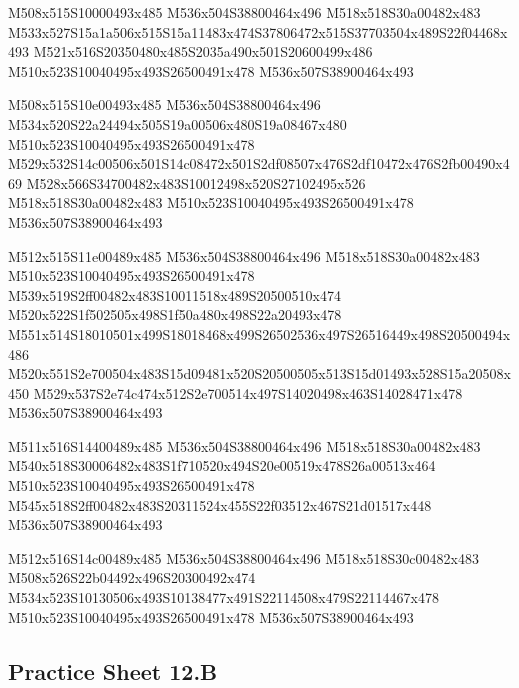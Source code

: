\documentclass{article}
\begin{document}
\begin{multicols}{5}
\begin{center}

M508x515S10000493x485 %
M536x504S38800464x496 %
M518x518S30a00482x483 %
M533x527S15a1a506x515S15a11483x474S37806472x515S37703504x489S22f04468x493 %
M521x516S20350480x485S2035a490x501S20600499x486 %
M510x523S10040495x493S26500491x478 %
M536x507S38900464x493 %
\vfil
\columnbreak

M508x515S10e00493x485 %
M536x504S38800464x496 %
M534x520S22a24494x505S19a00506x480S19a08467x480 %
M510x523S10040495x493S26500491x478 %
M529x532S14c00506x501S14c08472x501S2df08507x476S2df10472x476S2fb00490x469 %
M528x566S34700482x483S10012498x520S27102495x526 %
M518x518S30a00482x483 %
M510x523S10040495x493S26500491x478 %
M536x507S38900464x493 %
\vfil
\columnbreak

M512x515S11e00489x485 %
M536x504S38800464x496 %
M518x518S30a00482x483 %
M510x523S10040495x493S26500491x478 %
M539x519S2ff00482x483S10011518x489S20500510x474 %
M520x522S1f502505x498S1f50a480x498S22a20493x478 %
M551x514S18010501x499S18018468x499S26502536x497S26516449x498S20500494x486 %
M520x551S2e700504x483S15d09481x520S20500505x513S15d01493x528S15a20508x450 %
M529x537S2e74c474x512S2e700514x497S14020498x463S14028471x478 %
M536x507S38900464x493 %
\vfil
\columnbreak

M511x516S14400489x485 %
M536x504S38800464x496 %
M518x518S30a00482x483 %
M540x518S30006482x483S1f710520x494S20e00519x478S26a00513x464 %
M510x523S10040495x493S26500491x478 %
M545x518S2ff00482x483S20311524x455S22f03512x467S21d01517x448 %
M536x507S38900464x493 %
\vfil
\columnbreak

M512x516S14c00489x485 %
M536x504S38800464x496 %
M518x518S30c00482x483 %
M508x526S22b04492x496S20300492x474 %
M534x523S10130506x493S10138477x491S22114508x479S22114467x478 %
M510x523S10040495x493S26500491x478 %
M536x507S38900464x493 %
\vfil

\end{center}
\end{multicols}

\subsection{Practice Sheet 12.B}
\end{document}
